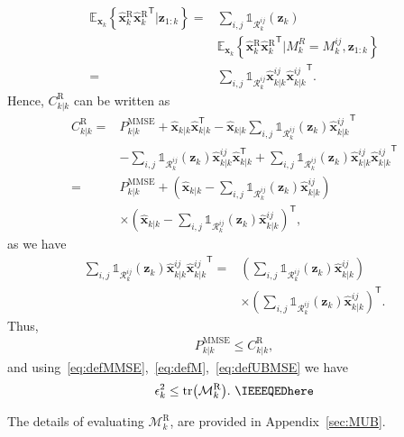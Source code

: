 \documentclass[10pt,twocolumn,twoside]{IEEEtran}
\newcommand{\tran}{^{\mathsf{T}}}
\newcommand{\expectx}{\mathds{E}_{\mathbf{x}_k}\!}
\newcommand{\Pmmse}{P_{k|k}^{\mathrm{MMSE}}}
\begin{document}
\begin{IEEEproof}
{\begin{align}
\nonumber
\expectx{\left\lbrace \hat{\mathbf{{x}}}{_{k}^{\mathrm{R}}}\hat{\mathbf{{x}}}{_{k}^{\mathrm{R}}}\tran \big| \mathbf{{z}}_{1:k} \right\rbrace} = & \sum\limits_{i,j}   \mathds{1}_{\mathcal{R}^{ij}_k}{\left(\mathbf{z}_k\right)}\\
& \expectx{\left\lbrace \hat{\mathbf{{x}}}{_{k}^{\mathrm{R}}}\hat{\mathbf{{x}}}{_{k}^{\mathrm{R}}}\tran \big|M^{R}_k = M_k^{ij}, \mathbf{{z}}_{1:k} \right\rbrace} \\
=& \sum\limits_{i,j}  \mathds{1}_{\mathcal{R}^{ij}_k} \mathsf{\hat{\boldsymbol{x}}}{_{k|k}^{ij}}\mathsf{\hat{\boldsymbol{x}}}{_{k|k}^{ij}}\tran.
\end{align}
Hence, \(C_{k|k}^{\mathrm{R}}\) can be written as
\begin{align}
\nonumber
C_{k|k}^{\mathrm{R}} =& \Pmmse + \mathsf{\hat{\boldsymbol{x}}}_{k|k}\mathsf{\hat{\boldsymbol{x}}}_{k|k}\tran - \mathsf{\hat{\boldsymbol{x}}}_{k|k} \sum\limits_{i,j} \mathds{1}_{\mathcal{R}^{ij}_k}{\left(\mathbf{z}_k\right)} \mathsf{\hat{\boldsymbol{x}}}{_{k|k}^{ij}}\tran \\ \label{eq:defCGSFR}
&- \sum\limits_{i,j} \mathds{1}_{\mathcal{R}^{ij}_k}{\left(\mathbf{z}_k\right)} \mathsf{\hat{\boldsymbol{x}}}{_{k|k}^{ij}} \mathsf{\hat{\boldsymbol{x}}}_{k|k} \tran +\sum\limits_{i,j}  \mathds{1}_{\mathcal{R}^{ij}_k}{\left(\mathbf{z}_k\right)} \mathsf{\hat{\boldsymbol{x}}}{_{k|k}^{ij}}\mathsf{\hat{\boldsymbol{x}}}{_{k|k}^{ij}}\tran\\
\nonumber 
=& \Pmmse 
+ \left(\mathsf{\hat{\boldsymbol{x}}}_{k|k} - \sum\limits_{i,j} \mathds{1}_{\mathcal{R}^{ij}_k}{\left(\mathbf{z}_k\right)} \mathsf{\hat{\boldsymbol{x}}}{_{k|k}^{ij}}\right)\\
\label{eq:defCGSFR2}
& \times \left(\mathsf{\hat{\boldsymbol{x}}}_{k|k} - \sum\limits_{i,j} \mathds{1}_{\mathcal{R}^{ij}_k}{\left(\mathbf{z}_k\right)} \mathsf{\hat{\boldsymbol{x}}}{_{k|k}^{ij}}\right)\tran,
\end{align}
as we have
\begin{align}
\nonumber
\sum\limits_{i,j}  \mathds{1}_{\mathcal{R}^{ij}_k}{\left(\mathbf{z}_k\right)} \mathsf{\hat{\boldsymbol{x}}}{_{k|k}^{ij}}\mathsf{\hat{\boldsymbol{x}}}{_{k|k}^{ij}}\tran = &
\left(\sum\limits_{i,j} \mathds{1}_{\mathcal{R}^{ij}_k}{\left(\mathbf{z}_k\right)}\mathsf{\hat{\boldsymbol{x}}}{_{k|k}^{ij}}\right) \\ 
& \times \left(\sum\limits_{i,j} \mathds{1}_{\mathcal{R}^{ij}_k}{\left(\mathbf{z}_k\right)}\mathsf{\hat{\boldsymbol{x}}}{_{k|k}^{ij}}\right)\tran.
\end{align}
Thus, 
\begin{align}
\Pmmse \leq C_{k|k}^{\mathrm{R}},
\end{align}
and using~\eqref{eq:defMMSE},~\eqref{eq:defM},~\eqref{eq:defUBMSE} we have}
\begin{align}
\label{eq:UB}
\epsilon_k ^{2} \leq \mathrm{tr}{\left(\mathcal{M}^{\mathrm{R}}_k\right)}. \ \IEEEQEDhere
\end{align}
\end{IEEEproof}
The details of evaluating \(\mathcal{M}^{\mathrm{R}}_k\), are provided in Appendix~\ref{sec:MUB}.
\end{document}
